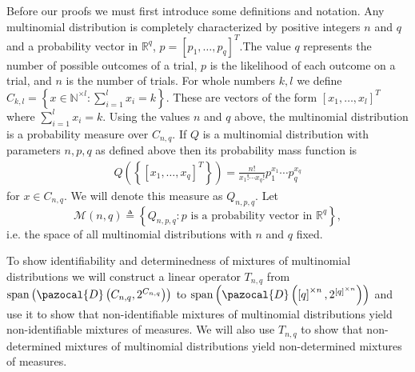 \documentclass[aos,preprint]{imsart}
\def\rn{\mathbb{R}}
\def\nn{\mathbb{N}}
\def\l{\left}
\def\r{\right}
\def\sM{\pazocal{M}}
\def\sD{\pazocal{D}}
\def\sM{\mathscr{M}}
\def\spn{\operatorname{span}}
\theoremstyle{plain}
\theoremstyle{defintion}
\begin{document}
	Before our proofs we must first introduce some definitions and notation. Any multinomial distribution is completely characterized by positive integers $n$ and $q$ and a probability vector in $\rn^q$, $ p = \left[ p_1,\ldots,p_q \right]^T$.The value $q$ represents the number of possible outcomes of a trial, $p$ is the likelihood of each outcome on a trial, and $n$ is the number of trials. For whole numbers $k,l$ we define $C_{k,l}= \l\{x \in \nn^{\times l} : \sum_{i=1}^l x_i = k\r\}$. These are vectors of the form $\left[ x_1,\ldots,x_l \right]^T$ where $\sum_{i=1}^l x_i =k$. Using the values $n$ and $q$ above, the multinomial distribution is a probability measure over $C_{n,q}$. If $Q$ is a multinomial distribution with parameters $n,p,q$ as defined above then its probability mass function is 
	\begin{eqnarray*}
		Q\left(\l\{ \left[ x_1,\ldots,x_q \right]^T\r\} \right) =
		\frac{n!}{x_1! \cdots x_q !} p_1^{x_1}\cdots p_q^{x_q}
	\end{eqnarray*} 
	for $x \in C_{n,q}$.
	We will denote this measure as $Q_{n,p,q}$.
	Let 
	\begin{equation*}
		\sM\left( n,q \right)\triangleq \l\{Q_{n,p,q} : p \text{ is a probability vector in } \rn^q \r\},
	\end{equation*}
	i.e. the space of all multinomial distributions with $n$ and $q$ fixed.

To show identifiability and determinedness of mixtures of multinomial distributions we will construct a linear operator $T_{n,q}$ from $\spn \l(\sD\l(C_{n,q},2^{C_{n,q}}\right)\r)$ to $\spn\l(\sD\l(\left[ q \right]^{\times n}, 2^{\left[ q \right]^{\times n}}\r)\r)$ and use it to show that non-identifiable mixtures of multinomial distributions yield non-identifiable mixtures of measures. We will also use $T_{n,q}$ to show that non-determined mixtures of multinomial distributions yield non-determined mixtures of measures.
\end{document}
